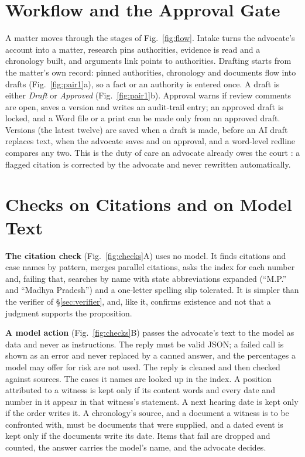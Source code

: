 \section{Workflow and the Approval Gate}
\label{sec:workflow}
A matter moves through the stages of Fig.~\ref{fig:flow}. Intake turns the advocate's account into a matter, research pins authorities, evidence is read and a chronology built, and arguments link points to authorities. Drafting starts from the matter's own record: pinned authorities, chronology and documents flow into drafts (Fig.~\ref{fig:pair1}a), so a fact or an authority is entered once. A draft is either \emph{Draft} or \emph{Approved} (Fig.~\ref{fig:pair1}b). Approval warns if review comments are open, saves a version and writes an audit-trail entry; an approved draft is locked, and a Word file or a print can be made only from an approved draft. Versions (the latest twelve) are saved when a draft is made, before an AI draft replaces text, when the advocate saves and on approval, and a word-level redline compares any two. This is the duty of care an advocate already owes the court \cite{gummadi}: a flagged citation is corrected by the advocate and never rewritten automatically.





\section{Checks on Citations and on Model Text}
\label{sec:checks}
\textbf{The citation check} (Fig.~\ref{fig:checks}A) uses no model. It finds citations and case names by pattern, merges parallel citations, asks the index for each number and, failing that, searches by name with state abbreviations expanded (``M.P.'' and ``Madhya Pradesh'') and a one-letter spelling slip tolerated. It is simpler than the verifier of \S\ref{sec:verifier}, and, like it, confirms existence and not that a judgment supports the proposition.

\textbf{A model action} (Fig.~\ref{fig:checks}B) passes the advocate's text to the model as data and never as instructions. The reply must be valid JSON; a failed call is shown as an error and never replaced by a canned answer, and the percentages a model may offer for risk are not used. The reply is cleaned and then checked against sources. The cases it names are looked up in the index. A position attributed to a witness is kept only if its content words and every date and number in it appear in that witness's statement. A next hearing date is kept only if the order writes it. A chronology's source, and a document a witness is to be confronted with, must be documents that were supplied, and a dated event is kept only if the documents write its date. Items that fail are dropped and counted, the answer carries the model's name, and the advocate decides.

